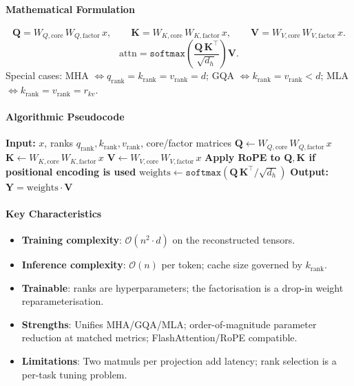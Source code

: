 \paragraph{Mathematical Formulation}
\[
\mathbf{Q} = W_{Q,\text{core}}\, W_{Q,\text{factor}}\, x, \qquad
\mathbf{K} = W_{K,\text{core}}\, W_{K,\text{factor}}\, x, \qquad
\mathbf{V} = W_{V,\text{core}}\, W_{V,\text{factor}}\, x.
\]
\[
\text{attn} = \texttt{softmax}\!\left(\frac{\mathbf{Q}\, \mathbf{K}^\top}{\sqrt{d_h}}\right) \mathbf{V}.
\]
Special cases: MHA $\Leftrightarrow q_{\text{rank}} = k_{\text{rank}} = v_{\text{rank}} = d$; GQA $\Leftrightarrow k_{\text{rank}} = v_{\text{rank}} < d$; MLA $\Leftrightarrow k_{\text{rank}} = v_{\text{rank}} = r_{kv}$.

\paragraph{Algorithmic Pseudocode}
\begin{algorithmic}[1]
\State \textbf{Input:} $x$, ranks $q_{\text{rank}}, k_{\text{rank}}, v_{\text{rank}}$, core/factor matrices
\State $\mathbf{Q} \gets W_{Q,\text{core}}\, W_{Q,\text{factor}}\, x$ 
\State $\mathbf{K} \gets W_{K,\text{core}}\, W_{K,\text{factor}}\, x$ 
\State $\mathbf{V} \gets W_{V,\text{core}}\, W_{V,\text{factor}}\, x$ 
\State \textbf{Apply RoPE to $\mathbf{Q}, \mathbf{K}$ if positional encoding is used}
\State $\text{weights} \gets \texttt{softmax}(\mathbf{Q}\, \mathbf{K}^\top / \sqrt{d_h})$ 
\State \textbf{Output:} $\mathbf{Y} = \text{weights} \cdot \mathbf{V}$
\end{algorithmic}

\paragraph{Key Characteristics}
\begin{itemize}[leftmargin=*]
    \item \textbf{Training complexity}: $\mathcal{O}(n^2 \cdot d)$ on the reconstructed tensors.
    \item \textbf{Inference complexity}: $\mathcal{O}(n)$ per token; cache size governed by $k_{\text{rank}}$.
    \item \textbf{Trainable}: ranks are hyperparameters; the factorisation is a drop-in weight reparameterisation.
    \item \textbf{Strengths}: Unifies MHA/GQA/MLA; order-of-magnitude parameter reduction at matched metrics; FlashAttention/RoPE compatible.
    \item \textbf{Limitations}: Two matmuls per projection add latency; rank selection is a per-task tuning problem.
\end{itemize}

